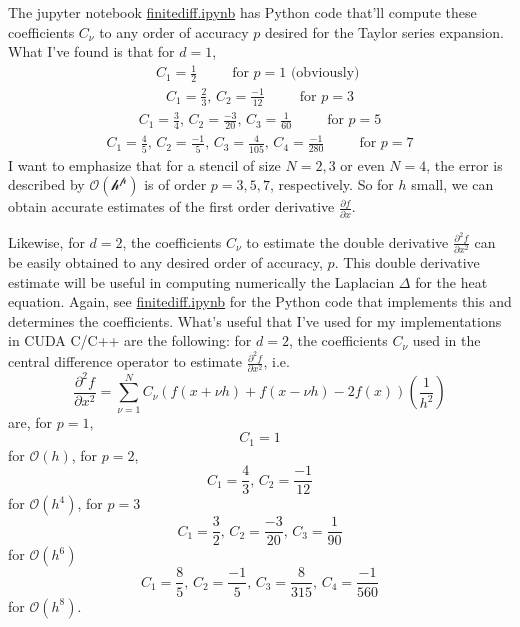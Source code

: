 \documentclass[10pt, landscape]{amsart}
\begin{document}
The jupyter notebook \href{https://nbviewer.jupyter.org/github/ernestyalumni/CompPhys/blob/master/finitediff.ipynb}{finitediff.ipynb} has Python code that'll compute these coefficients $C_{\nu}$ to any order of accuracy $p$ desired for the Taylor series expansion.  What I've found is that for $d=1$,
\[
\begin{gathered}
  C_1 = \frac{1}{2} \qquad \, \text{ for } p = 1  \text{ (obviously) }
\end{gathered}
\]
\[
\begin{gathered}
  C_1 = \frac{2}{3}, \, C_2 = \frac{-1}{12} \qquad \, \text{ for } p = 3  
\end{gathered}
\]
\[
\begin{gathered}
  C_1 = \frac{3}{4}, \, C_2 = \frac{-3}{20}, \, C_3 = \frac{1}{60} \qquad \, \text{ for } p = 5  
\end{gathered}
\]
\[
\begin{gathered}
  C_1 = \frac{4}{5}, \, C_2 = \frac{-1}{5}, \, C_3 = \frac{4}{105}, \, C_4 = \frac{-1}{280} \qquad \, \text{ for } p = 7  
\end{gathered}
\]
I want to emphasize that for a stencil of size $N=2,3$ or even $N=4$, the error is described by $\mathcal{O(h^p)}$ is of order $p=3,5,7$, respectively.  So for $h$ small, we can obtain accurate estimates of the first order derivative $\frac{ \partial f}{ \partial x}$.

Likewise, for $d=2$, the coefficients $C_{\nu}$ to estimate the double derivative $\frac{ \partial^2 f}{ \partial x^2}$ can be easily obtained to any desired order of accuracy, $p$.  This double derivative estimate will be useful in computing numerically the Laplacian $\Delta$ for the heat equation.  Again, see \href{https://nbviewer.jupyter.org/github/ernestyalumni/CompPhys/blob/master/finitediff.ipynb}{finitediff.ipynb} for the Python code that implements this and determines the coefficients.  What's useful that I've used for my implementations in CUDA C/C++ are the following: for $d=2$, the coefficients $C_{\nu}$ used in the central difference operator to estimate $\frac{\partial^2 f}{ \partial x^2}$, i.e.
\[
\frac{ \partial^2 f}{ \partial x^2} = \sum_{\nu = 1}^N C_{\nu} (f(x+\nu h) + f(x-\nu h) - 2f(x)) \left( \frac{1}{h^2} \right)
\]
are, for $p=1$,
\[
C_{1} = 1
\]
for $\mathcal{O}(h)$, for $p=2$,
\[
C_1 = \frac{4}{3}, \, C_2 = \frac{-1}{12}
\]
for $\mathcal{O}(h^4)$, for $p=3$
\[
C_1 = \frac{3}{2}, \, C_2 = \frac{-3}{20}, \, C_3 = \frac{1}{90}
\]
for $\mathcal{O}(h^6)$
\[
C_1 = \frac{8}{5}, \, C_2 = \frac{-1}{5}, \, C_3 = \frac{8}{315}, \, C_4 = \frac{-1}{560}
\]
for $\mathcal{O}(h^8)$.  
\end{document}

